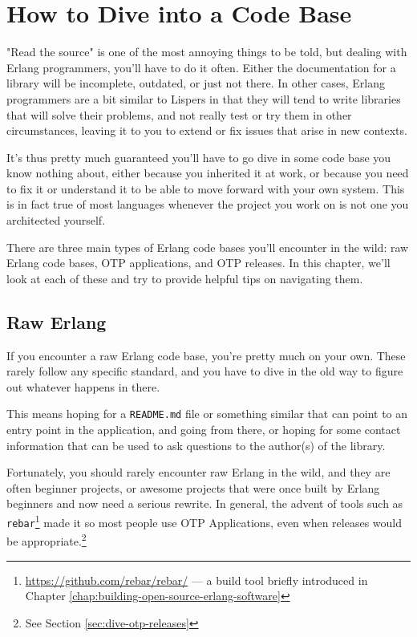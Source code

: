 \documentclass[11pt, oneside]{book}   	%
\newcommand{\filename}[1]{\Verb`#1`}
\newcommand{\app}[1]{\Verb`#1`}
\begin{document}
\chapter{How to Dive into a Code Base}
\label{chap:how-to-dive-into-a-code-base}

"Read the source" is one of the most annoying things to be told, but dealing with Erlang programmers, you'll have to do it often. Either the documentation for a library will be incomplete, outdated, or just not there. In other cases, Erlang programmers are a bit similar to Lispers in that they will tend to write libraries that will solve their problems, and not really test or try them in other circumstances, leaving it to you to extend or fix issues that arise in new contexts.

It's thus pretty much guaranteed you'll have to go dive in some code base you know nothing about, either because you inherited it at work, or because you need to fix it or understand it to be able to move forward with your own system. This is in fact true of most languages whenever the project you work on is not one you architected yourself.

There are three main types of Erlang code bases you'll encounter in the wild: raw Erlang code bases, OTP applications, and OTP releases. In this chapter, we'll look at each of these and try to provide helpful tips on navigating them.

\section{Raw Erlang}
\label{sec:dive-raw-erlang}

If you encounter a raw Erlang code base, you're pretty much on your own. These rarely follow any specific standard, and you have to dive in the old way to figure out whatever happens in there.

This means hoping for a \filename{README.md} file or something similar that can point to an entry point in the application, and going from there, or hoping for some contact information that can be used to ask questions to the author(s) of the library.

Fortunately, you should rarely encounter raw Erlang in the wild, and they are often beginner projects, or awesome projects that were once built by Erlang beginners and now need a serious rewrite. In general, the advent of tools such as \app{rebar}\footnote{\href{https://github.com/rebar/rebar/}{https://github.com/rebar/rebar/} — a build tool briefly introduced in Chapter \ref{chap:building-open-source-erlang-software}} made it so most people use OTP Applications, even when releases would be appropriate.\footnote{See Section \ref{sec:dive-otp-releases}}
\end{document}
